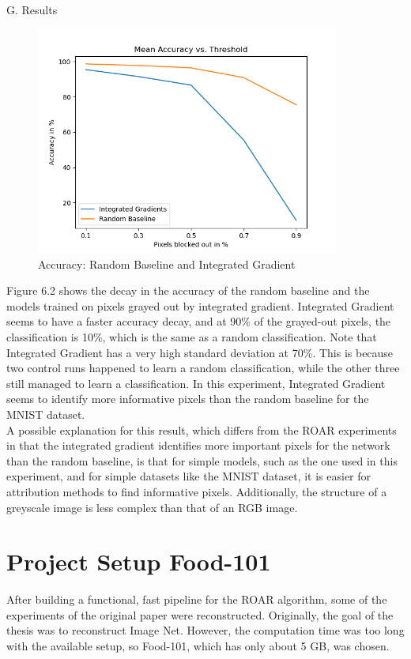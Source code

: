 G. Results

\begin{figure}[H]
	\centering
	\includegraphics[width=100mm]{figs/mean_accuracy_vs_threshold}
	\caption{Accuracy: Random Baseline and Integrated Gradient}
	\label{fig:Accuracy}
	
\end{figure}

Figure 6.2 shows the decay in the accuracy of the random baseline and the models trained on pixels grayed out by integrated gradient. Integrated Gradient seems to have a faster accuracy decay, and at 90\% of the grayed-out pixels, the classification is 10\%, which is the same as a random classification. Note that Integrated Gradient has a very high standard deviation at 70\%. This is because two control runs happened to learn a random classification, while the other three still managed to learn a classification. In this experiment, Integrated Gradient seems to identify more informative pixels than the random baseline for the MNIST dataset. \\
A possible explanation for this result, which differs from the ROAR experiments in that the integrated gradient identifies more important pixels for the network than the random baseline, is that for simple models, such as the one used in this experiment, and for simple datasets like the MNIST dataset, it is easier for attribution methods to find informative pixels. Additionally, the structure of a greyscale image is less complex than that of an RGB image.

\section{Project Setup Food-101}

After building a functional, fast pipeline for the ROAR algorithm, some of the experiments of the original paper were reconstructed. Originally, the goal of the thesis was to reconstruct Image Net. However, the computation time was too long with the available setup, so Food-101, which has only about 5 GB, was chosen.

